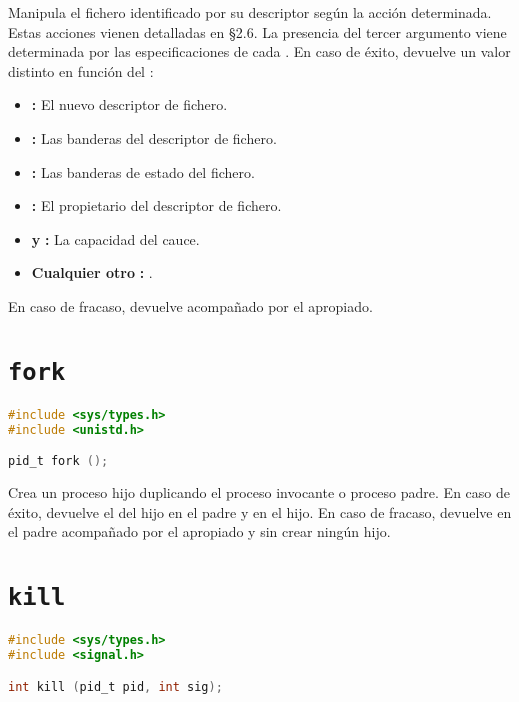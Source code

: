 Manipula el fichero identificado por su descriptor  según la acción  determinada.
Estas acciones vienen detalladas en \S2.6.
La presencia del tercer argumento  viene determinada por las especificaciones de cada .
En caso de éxito, devuelve un valor distinto en función del :

\begin{itemize}
	\item{}\textbf{:} El nuevo descriptor de fichero.
	\item{}\textbf{:} Las banderas del descriptor de fichero.
	\item{}\textbf{:} Las banderas de estado del fichero.
	\item{}\textbf{:} El propietario del descriptor de fichero.
	\item{} \textbf{y} \textbf{:} La capacidad del cauce.
	\item\textbf{Cualquier otro} \textbf{:} .
\end{itemize}

En caso de fracaso, devuelve  acompañado por el  apropiado.

\pagebreak

\section{\texttt{fork}}\label{fork}

\begin{lstlisting}[language=C]
#include <sys/types.h>
#include <unistd.h>

pid_t fork ();
\end{lstlisting}

Crea un proceso hijo duplicando el proceso invocante o proceso padre.
En caso de éxito, devuelve el  del hijo en el padre y  en el hijo.
En caso de fracaso, devuelve  en el padre acompañado por el  apropiado y sin crear ningún hijo.

\section{\texttt{kill}}\label{kill}

\begin{lstlisting}[language=C]
#include <sys/types.h>
#include <signal.h>

int kill (pid_t pid, int sig);
\end{lstlisting}


